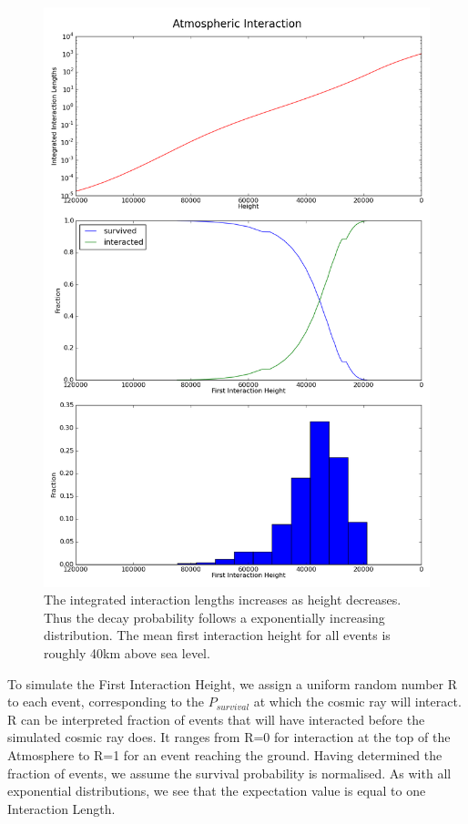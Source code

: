 \documentclass[11pt]{article}
\begin{document}
\begin{figure}
\begin{center}
\includegraphics[height=0.9\textheight]{generalheight}
\caption{The integrated interaction lengths increases as height decreases. Thus the decay probability follows a exponentially increasing distribution. The mean first interaction height for all events is roughly 40km above sea level.}
\label{fig:generalheight}
\end{center}
\end{figure}

To simulate the First Interaction Height, we assign a uniform random number R to each event, corresponding to the $P_{survival}$ at which the cosmic ray will interact. R can be interpreted fraction of events that will have interacted before the simulated cosmic ray does. It ranges from R=0 for interaction at the top of the Atmosphere to R=1 for an event reaching the ground. Having determined the fraction of events, we assume the survival probability is normalised. As with all exponential distributions, we see that the expectation value is equal to one Interaction Length.
\end{document}
